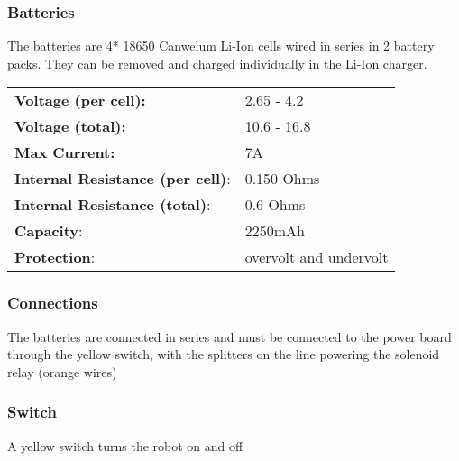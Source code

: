 \subsubsection{Batteries}
The batteries are 4* 18650 Canwelum Li-Ion cells wired in series in 2 battery packs. They can be removed and charged individually in the Li-Ion charger.

\begin{tabularx}{\textwidth}{XX}
\textbf{Voltage (per cell):}	& 2.65 - 4.2 \\
\textbf{Voltage (total):}		& 10.6 - 16.8 \\
\textbf{Max Current:}			& 7A \\
\textbf{Internal Resistance (per cell)}: & 0.150 Ohms \\
\textbf{Internal Resistance (total)}: & 0.6 Ohms \\
\textbf{Capacity}: & 2250mAh \\
\textbf{Protection}: & overvolt and undervolt \\
\end{tabularx}
    
\subsubsection{Connections}
The batteries are connected in series and must be connected to the power board through the yellow switch, with the splitters on the line powering the solenoid relay (orange wires)
\subsubsection{Switch}
A yellow switch turns the robot on and off